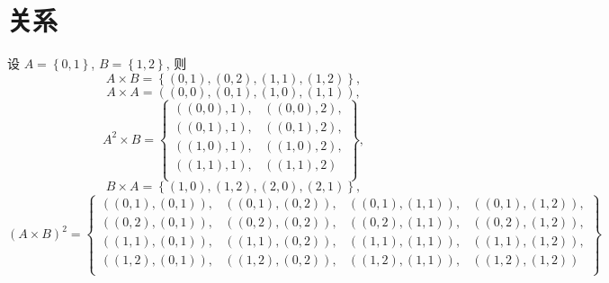 \documentclass[10pt,UTF8]{book} %
\begin{document}
\chapter{关系}

\begin{exercise}
    设 $A = \left\{ 0,1 \right\}$, $B = \left\{ 1,2 \right\}$,
    则
    \[ A \times B = \left\{
        (0,1), (0,2), (1,1), (1,2)
    \right\}, \]
    \[ A \times A = \left(
        (0,0), (0,1), (1,0), (1,1)
    \right), \]
    \[ A^2 \times B = \left\{
        \begin{matrix}
            ((0,0), 1), & ((0,0), 2), \\ 
            ((0,1), 1), & ((0,1), 2), \\ 
            ((1,0), 1), & ((1,0), 2), \\ 
            ((1,1), 1), & ((1,1), 2) \\
        \end{matrix}
    \right\}, \]
    \[ B \times A = \left\{
        (1,0), (1,2),
        (2,0), (2,1)
    \right\}, \]
    \[ \left( A \times B \right)^2
    = \left\{ \begin{matrix}
        ((0,1), (0,1)), & ((0,1), (0,2)), & ((0,1), (1,1)), & ((0,1), (1,2)), \\
        ((0,2), (0,1)), & ((0,2), (0,2)), & ((0,2), (1,1)), & ((0,2), (1,2)), \\
        ((1,1), (0,1)), & ((1,1), (0,2)), & ((1,1), (1,1)), & ((1,1), (1,2)), \\
        ((1,2), (0,1)), & ((1,2), (0,2)), & ((1,2), (1,1)), & ((1,2), (1,2)) \\
    \end{matrix} \right\} \]
\end{exercise}
\end{document}
